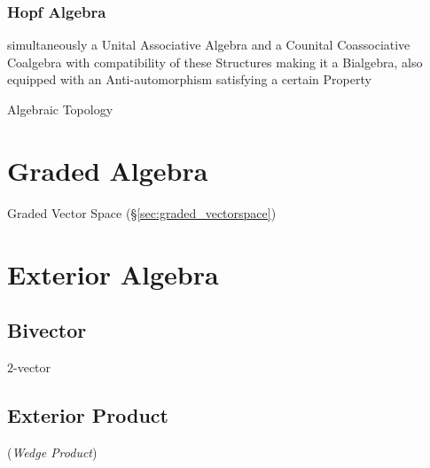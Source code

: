\subsubsection{Hopf Algebra}\label{sec:hopf_algebra}

simultaneously a Unital Associative Algebra and a Counital
Coassociative Coalgebra with compatibility of these Structures making
it a Bialgebra, also equipped with an Anti-automorphism satisfying a
certain Property %

Algebraic Topology



\section{Graded Algebra}\label{sec:graded_algebra}

Graded Vector Space (\S\ref{sec:graded_vectorspace})



\section{Exterior Algebra}\label{sec:exterior_algebra}

\subsection{Bivector}\label{sec:bivector}

$2$-vector



\subsection{Exterior Product}\label{sec:exterior_product}

(\emph{Wedge Product})



